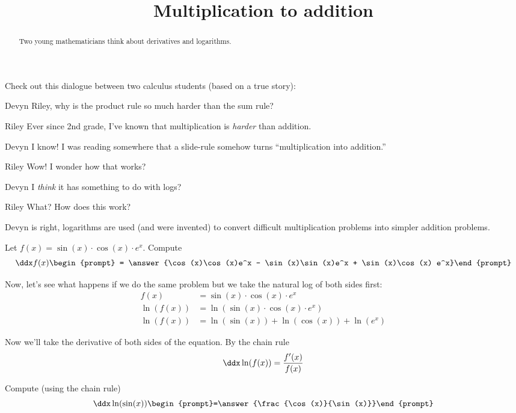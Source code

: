 \documentclass{ximera}
\title[Break-Ground:]{Multiplication to addition}
\begin{document}
\begin{abstract}
Two young mathematicians think about derivatives and logarithms.
\end{abstract}
\maketitle


Check out this dialogue between two calculus students (based on a true
story):

\begin{dialogue}
\item[Devyn] Riley, why is the product rule so much harder than the sum rule?
\item[Riley] Ever since 2nd grade, I've known that multiplication is
  \textit{harder} than addition.
\item[Devyn] I know! I was reading somewhere that a slide-rule somehow
  turns ``multiplication into addition.''
\item[Riley] Wow! I wonder how that works?
\item[Devyn] I \textit{think} it has something to do with logs?
\item[Riley] What? How does this work?
\end{dialogue}

Devyn is right, logarithms are used (and were invented) to convert
difficult multiplication problems into simpler addition problems.

\begin{problem}
  Let $f(x) = \sin(x) \cdot \cos(x) \cdot e^x$. Compute
  \[
  \ddx f(x)\begin{prompt} = \answer{\cos(x)\cos(x)e^x - \sin(x)\sin(x)e^x + \sin(x)\cos(x) e^x}\end{prompt}
  \]
\end{problem}

Now, let's see what happens if we do the same problem but we take the
natural log of both sides first:
\begin{align*}
  f(x) &= \sin(x)\cdot\cos(x)\cdot e^x\\
  \ln(f(x)) &= \ln(\sin(x)\cdot\cos(x)\cdot e^x)\\
  \ln(f(x)) &=\ln(\sin(x)) + \ln(\cos(x)) + \ln(e^x)
\end{align*}

Now we'll take the derivative of both sides of the equation.
By the chain rule
\[
\ddx \ln(f(x))= \frac{f'(x)}{f(x)}
\]


\begin{problem}
  Compute (using the chain rule)
  \[
  \ddx \ln(\sin(x))  \begin{prompt}=\answer{\frac{\cos(x)}{\sin(x)}}\end{prompt}
  \]
\end{problem}
\end{document}
